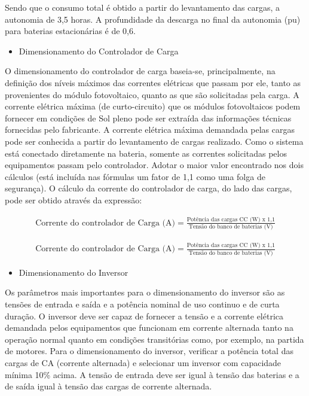 Sendo que o consumo total é obtido a partir do levantamento das cargas, a autonomia de 3,5 horas. A profundidade da descarga no final da autonomia (pu) para baterias estacionárias é de 0,6.

\begin{itemize}
\item Dimensionamento do Controlador de Carga
\end{itemize}

		O dimensionamento do controlador de carga baseia-se, principalmente, na definição dos níveis máximos das correntes elétricas que passam por ele, tanto as provenientes do módulo fotovoltaico, quanto as que são solicitadas pela carga. A corrente elétrica máxima (de curto-circuito) que os módulos fotovoltaicos podem fornecer em condições de Sol pleno pode ser extraída das informações técnicas fornecidas pelo fabricante. A corrente elétrica máxima demandada pelas cargas pode ser conhecida a partir do levantamento de cargas realizado. Como o sistema está conectado diretamente na bateria, somente as correntes solicitadas pelos equipamentos passam pelo controlador. Adotar o maior valor encontrado nos dois cálculos (está incluída nas fórmulas um fator de 1,1 como uma folga de segurança).
        O cálculo da corrente do controlador de carga, do lado das cargas, pode ser obtido através da expressão:
        
\begin{eqnarray}
\text{Corrente do controlador de Carga (A)} = \frac{\text{Potência das cargas CC (W) x 1,1}}{\text{Tensão do banco de baterias (V)}}
\end{eqnarray}

\begin{eqnarray}
\text{Corrente do controlador de Carga (A)} = \frac{\text{Potência das cargas CC (W) x 1,1}}{\text{Tensão do banco de baterias (V)}}
\end{eqnarray}

\begin{itemize}
\item Dimensionamento do Inversor
\end{itemize}
        
        Os parâmetros mais importantes para o dimensionamento do inversor são as tensões de entrada e saída e a potência nominal de uso continuo e de curta duração. O inversor deve ser capaz de fornecer a tensão e a corrente elétrica demandada pelos equipamentos que funcionam em corrente alternada tanto na operação normal quanto em condições transitórias como, por exemplo, na partida de motores.
Para o dimensionamento do inversor, verificar a potência total das cargas de CA (corrente alternada) e selecionar um inversor com capacidade mínima 10\% acima. A tensão de entrada deve ser igual à tensão das baterias e a de saída igual à tensão das cargas de corrente alternada.

